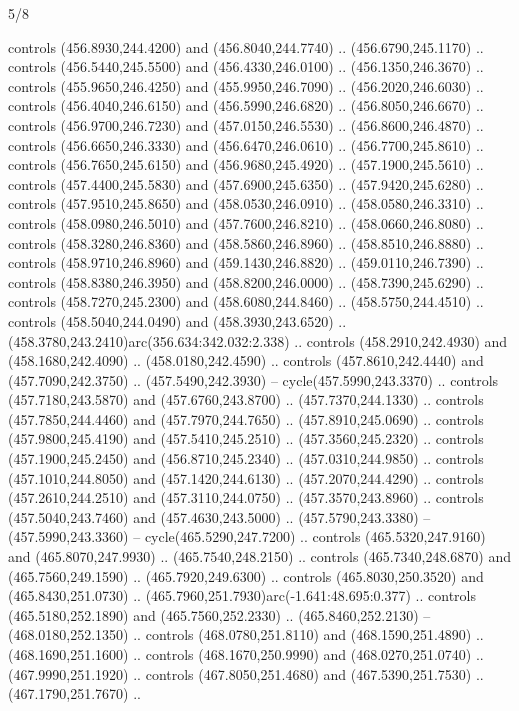 \begin{flagdescription}{5/8}
\begin{scope}[xshift=0.5\flaglength,yshift=0.5\flagwidth,scale=\flagwidth/475.63]
\begin{scope}[y=0.8pt, x=0.8pt, yscale=-1, xscale=1,shift={(-450,-300)}]
\begin{scope}[cm={{1.0,0.0,0.0,1.0,(-0.0002,0.12556)}},cm={{1.0,0.0,0.0,1.0,(0.00179,0.0)}}]
\begin{scope}[cm={{1.00926,0.0,0.0,1.00926,(-3.1541,-2.47648)}}]
  controls (456.8930,244.4200) and (456.8040,244.7740) .. (456.6790,245.1170) ..
  controls (456.5440,245.5500) and (456.4330,246.0100) .. (456.1350,246.3670) ..
  controls (455.9650,246.4250) and (455.9950,246.7090) .. (456.2020,246.6030) ..
  controls (456.4040,246.6150) and (456.5990,246.6820) .. (456.8050,246.6670) ..
  controls (456.9700,246.7230) and (457.0150,246.5530) .. (456.8600,246.4870) ..
  controls (456.6650,246.3330) and (456.6470,246.0610) .. (456.7700,245.8610) ..
  controls (456.7650,245.6150) and (456.9680,245.4920) .. (457.1900,245.5610) ..
  controls (457.4400,245.5830) and (457.6900,245.6350) .. (457.9420,245.6280) ..
  controls (457.9510,245.8650) and (458.0530,246.0910) .. (458.0580,246.3310) ..
  controls (458.0980,246.5010) and (457.7600,246.8210) .. (458.0660,246.8080) ..
  controls (458.3280,246.8360) and (458.5860,246.8960) .. (458.8510,246.8880) ..
  controls (458.9710,246.8960) and (459.1430,246.8820) .. (459.0110,246.7390) ..
  controls (458.8380,246.3950) and (458.8200,246.0000) .. (458.7390,245.6290) ..
  controls (458.7270,245.2300) and (458.6080,244.8460) .. (458.5750,244.4510) ..
  controls (458.5040,244.0490) and (458.3930,243.6520) ..
  (458.3780,243.2410)arc(356.634:342.032:2.338) .. controls (458.2910,242.4930)
  and (458.1680,242.4090) .. (458.0180,242.4590) .. controls (457.8610,242.4440)
  and (457.7090,242.3750) .. (457.5490,242.3930) -- cycle(457.5990,243.3370) ..
  controls (457.7180,243.5870) and (457.6760,243.8700) .. (457.7370,244.1330) ..
  controls (457.7850,244.4460) and (457.7970,244.7650) .. (457.8910,245.0690) ..
  controls (457.9800,245.4190) and (457.5410,245.2510) .. (457.3560,245.2320) ..
  controls (457.1900,245.2450) and (456.8710,245.2340) .. (457.0310,244.9850) ..
  controls (457.1010,244.8050) and (457.1420,244.6130) .. (457.2070,244.4290) ..
  controls (457.2610,244.2510) and (457.3110,244.0750) .. (457.3570,243.8960) ..
  controls (457.5040,243.7460) and (457.4630,243.5000) .. (457.5790,243.3380) --
  (457.5990,243.3360) -- cycle(465.5290,247.7200) .. controls
  (465.5320,247.9160) and (465.8070,247.9930) .. (465.7540,248.2150) .. controls
  (465.7340,248.6870) and (465.7560,249.1590) .. (465.7920,249.6300) .. controls
  (465.8030,250.3520) and (465.8430,251.0730) ..
  (465.7960,251.7930)arc(-1.641:48.695:0.377) .. controls (465.5180,252.1890)
  and (465.7560,252.2330) .. (465.8460,252.2130) -- (468.0180,252.1350) ..
  controls (468.0780,251.8110) and (468.1590,251.4890) .. (468.1690,251.1600) ..
  controls (468.1670,250.9990) and (468.0270,251.0740) .. (467.9990,251.1920) ..
  controls (467.8050,251.4680) and (467.5390,251.7530) .. (467.1790,251.7670) ..

\end{scope}
\end{scope}
\end{scope}
\end{scope}
\end{flagdescription}
